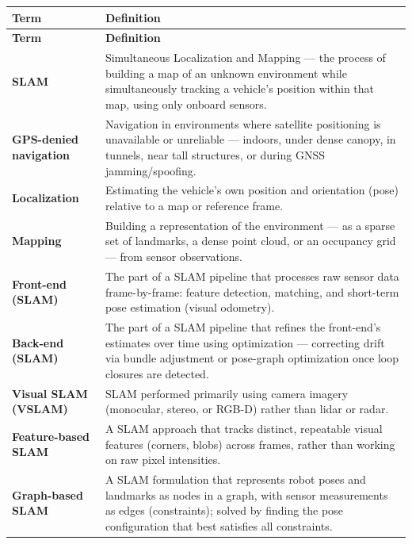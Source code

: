 \documentclass[11pt,a4paper]{article}
\begin{document}
\begin{longtable}{@{}p{4.5cm}p{10.5cm}@{}}
    \toprule
    \textbf{Term} & \textbf{Definition} \\
    \midrule
    \endfirsthead
    \toprule
    \textbf{Term} & \textbf{Definition} \\
    \midrule
    \endhead
    \bottomrule
    \endfoot

    \textbf{SLAM} & Simultaneous Localization and Mapping --- the process of building a map of an unknown environment while simultaneously tracking a vehicle's position within that map, using only onboard sensors. \\
    \midrule
    \textbf{GPS-denied navigation} & Navigation in environments where satellite positioning is unavailable or unreliable --- indoors, under dense canopy, in tunnels, near tall structures, or during GNSS jamming/spoofing. \\
    \midrule
    \textbf{Localization} & Estimating the vehicle's own position and orientation (pose) relative to a map or reference frame. \\
    \midrule
    \textbf{Mapping} & Building a representation of the environment --- as a sparse set of landmarks, a dense point cloud, or an occupancy grid --- from sensor observations. \\
    \midrule
    \textbf{Front-end (SLAM)} & The part of a SLAM pipeline that processes raw sensor data frame-by-frame: feature detection, matching, and short-term pose estimation (visual odometry). \\
    \midrule
    \textbf{Back-end (SLAM)} & The part of a SLAM pipeline that refines the front-end's estimates over time using optimization --- correcting drift via bundle adjustment or pose-graph optimization once loop closures are detected. \\
    \midrule
    \textbf{Visual SLAM (VSLAM)} & SLAM performed primarily using camera imagery (monocular, stereo, or RGB-D) rather than lidar or radar. \\
    \midrule
    \textbf{Feature-based SLAM} & A SLAM approach that tracks distinct, repeatable visual features (corners, blobs) across frames, rather than working on raw pixel intensities. \\
    \midrule
    \textbf{Graph-based SLAM} & A SLAM formulation that represents robot poses and landmarks as nodes in a graph, with sensor measurements as edges (constraints); solved by finding the pose configuration that best satisfies all constraints. \\

\end{longtable}
\end{document}
